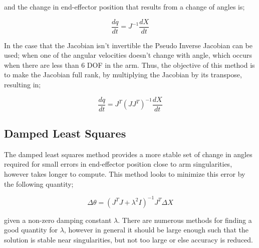 \documentclass[12pt,openany,a4paper]{book}
\begin{document}
\vspace{\baselineskip}
and the change in end-effector position that results from a change of angles is;

\vspace{\baselineskip}
\begin{equation}
\frac{dq}{dt} = J^{-1} \frac{dX}{dt}
\end{equation}

\vspace{\baselineskip}
In the case that the Jacobian isn't invertible the Pseudo Inverse Jacobian can be used; when one of the angular velocities doesn't change with angle, which occurs when there are less than 6 DOF in the arm. Thus, the objective of this method is to make the Jacobian full rank, by multiplying the Jacobian by its transpose, resulting in;

\vspace{\baselineskip}
\begin{equation}
\frac{dq}{dt} = J^T (J J^T)^{-1} \frac{dX}{dt} 
\end{equation}

\vspace{\baselineskip}
\subsection{Damped Least Squares}
The damped least squares method provides a more stable set of change in angles required for small errors in end-effector position close to arm singularities, however takes longer to compute. This method looks to minimize this error by the following quantity;

\vspace{\baselineskip}
\begin{equation}
\Delta \theta = (J^T J + \lambda^2 I)^{-1} J^T \Delta X
\end{equation}

\vspace{\baselineskip}
given a non-zero damping constant $\lambda$. There are numerous methods for finding a good quantity for $\lambda$, however in general it should be large enough such that the solution is stable near singularities, but not too large or else accuracy is reduced.

\end{document}
